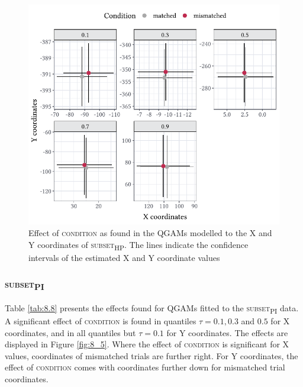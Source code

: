 \begin{figure}
    \centering
    \includegraphics[]{figures/fig8.4.pdf}
    \caption{Effect of \textsc{condition} as found in the QGAMs modelled to the X and Y coordinates of \textsc{subset\textsubscript{HP}}. The lines indicate the confidence intervals of the estimated X and Y coordinate values}
    \label{fig:8_4}
\end{figure}

\subsubsection{\textsc{subset\textsubscript{PI}}}\label{section08_2_2_3}

Table \ref{tab:8.8} presents the effects found for QGAMs fitted to the \textsc{subset\textsubscript{PI}} data. A significant effect of \textsc{condition} is found in quantiles $\tau=0.1,0.3$ and $0.5$ for X coordinates, and in all quantiles but $\tau=0.1$ for Y coordinates. The effects are displayed in Figure \ref{fig:8_5}. Where the effect of \textsc{condition} is significant for X values, coordinates of mismatched trials are further right. For Y coordinates, the effect of \textsc{condition} comes with coordinates further down for mismatched trial coordinates.

